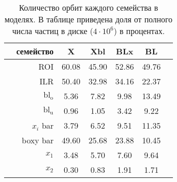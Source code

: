 \documentclass[tikz]{trlnotes}
\begin{document}
\begin{table}[hb]
  \centering
  \begin{tabular}{cr|ccccc}
    \toprule
              & семейство            & X     & Xbl   & BLx   & BL    & \\
    \midrule
              & ROI                  & 60.08 & 45.90 & 52.86 & 49.76 & \\
              & ILR                  & 50.40 & 32.98 & 34.16 & 22.37 & \\
              & $\text{bl}_\text{o}$ & 5.36  & 7.82  & 9.98  & 13.49 & \\
              & $\text{bl}_\text{u}$ & 0.96  & 1.05  & 3.42  & 9.22  & \\
              & $x_i$ bar            & 3.79  & 6.52  & 9.51  & 11.35 & \\
              & boxy bar             & 49.60 & 25.68 & 23.88 & 10.45 & \\
              & $x_1$                & 3.48  & 5.70  & 7.60  & 9.64  & \\
              & $x_2$                & 0.30  & 0.83  & 1.91  & 1.71  & \\
    \bottomrule
  \end{tabular}
  \caption{Количество орбит каждого семейства в моделях. В таблице приведена доля от полного числа частиц в диске ($4\cdot 10^6$) в процентах. }
  \label{tab:familiesnumbers}
\end{table}
\end{document}
